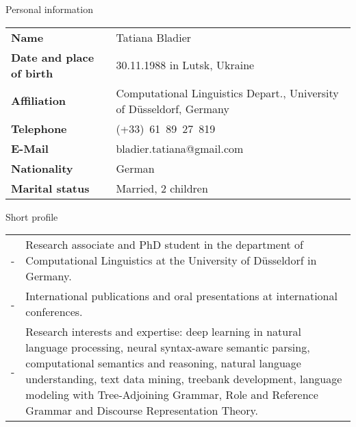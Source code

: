 \documentclass{resume} %
\begin{document}

\begin{rSection}{Personal information}

\hspace{-20pt}
\begin{tabular}{p{5cm}p{15cm}}
 {\bf Name}    & Tatiana Bladier  \\
 {\bf Date and place of birth}    & 30.11.1988 in Lutsk, Ukraine \\
 {\bf Affiliation}  & Computational Linguistics Depart., University of D{\"u}sseldorf, Germany \\
 {\bf Telephone }  & (+33)~61~89~27~819 \\
 {\bf E-Mail }  & bladier.tatiana@gmail.com \\
 {\bf Nationality }  & German \\
 {\bf Marital status }  & Married, 2 children \\
\end{tabular}

\end{rSection}

\bigskip

\begin{rSection}{Short profile}

\hspace{-20pt}
\begin{tabular}{p{0.1cm}p{17cm}}
 - & Research associate and PhD student in the department of Computational Linguistics at the University of D{\"u}sseldorf in Germany. \\
 - & International publications and oral presentations at international conferences. \\[-13pt]
 - & Research interests and expertise: deep learning in natural language processing, neural syntax-aware semantic parsing, computational semantics and reasoning, natural language understanding, text data mining, treebank development, language modeling with Tree-Adjoining Grammar, Role and Reference Grammar and Discourse Representation Theory. \\
\end{tabular}

\end{rSection}
\end{document}
